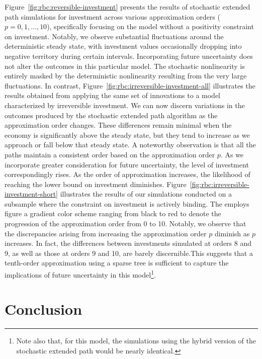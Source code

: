 \documentclass[a4paper,11pt]{amsart}
\begin{document}
Figure~\ref{fig:rbc:reversible-investment} presents the results of
stochastic extended path simulations for investment across various
approximation orders (\(p=0,1,\ldots,10\)), specifically focusing on
the model without a positivity constraint on investment. Notably, we
observe substantial fluctuations around the deterministic steady
state, with investment values occasionally dropping into negative
territory during certain intervals. Incorporating future uncertainty
does not alter the outcomes in this particular model. The
stochastic nonlinearity is entirely masked by the deterministic
nonlinearity resulting from the very large fluctuations. In contrast,
Figure~\ref{fig:rbc:irreversible-investment-all} illustrates the
results obtained from applying the same set of innovations to a model
characterized by irreversible investment. We can now discern
variations in the outcomes produced by the stochastic extended path
algorithm as the approximation order changes. These differences remain
minimal when the economy is significantly above the steady state, but
they tend to increase as we approach or fall below that steady
state. A noteworthy observation is that all the paths maintain a
consistent order based on the approximation order \(p\). As we
incorporate greater consideration for future uncertainty, the level of
investment correspondingly rises. As the order of approximation
increases, the likelihood of reaching the lower bound on investment
diminishes. Figure~\ref{fig:rbc:irreversible-investment-short}
illustrates the results of our simulations conducted on a subsample
where the constraint on investment is actively binding. The employs figure a gradient color
scheme ranging from black to red to denote the progression of the
approximation order from 0 to 10. Notably, we observe that the
discrepancies arising from increasing the approximation order \( p \)
diminish as \( p \) increases. In fact, the differences between
investments simulated at orders 8 and 9, as well as those at orders 9
and 10, are barely discernible.This suggests that a tenth-order
approximation using a sparse tree is sufficient to capture the
implications of future uncertainty in this model\footnote{Note also
   that, for this model, the simulations using the hybrid version of
   the stochastic extended path would be nearly identical.}.\newline

\section*{Conclusion}
\end{document}
